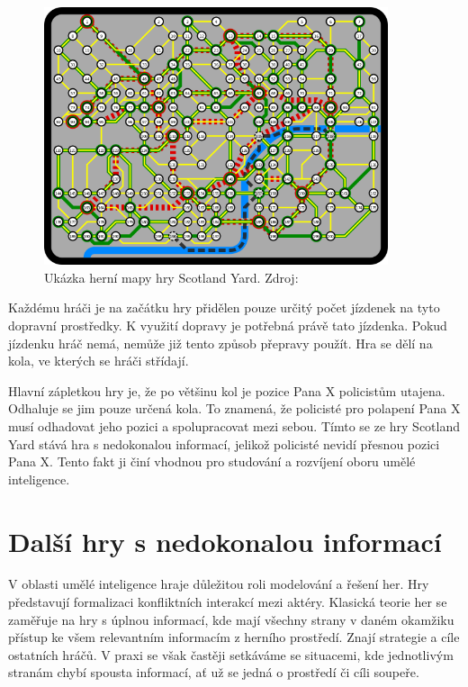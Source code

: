 \begin{figure}[H]
	\centering
	\includegraphics[width=0.9\textwidth]{obrazky-figures/scotland_original}
	\caption{Ukázka herní mapy hry Scotland Yard.
  Zdroj: \cite{scotland_original_image}}\label{fig:figure}
\end{figure}

Každému hráči je na začátku hry přidělen pouze určitý počet jízdenek na tyto dopravní prostředky.
K využití dopravy je potřebná právě tato jízdenka.
Pokud jízdenku hráč nemá, nemůže již tento způsob přepravy použít.
Hra se dělí na kola, ve kterých se hráči střídají.

Hlavní zápletkou hry je, že po většinu kol je pozice Pana X policistům utajena.
Odhaluje se jim pouze určená kola.
To znamená, že policisté pro polapení Pana X musí odhadovat jeho pozici a spolupracovat mezi sebou.
Tímto se ze hry Scotland Yard stává hra s nedokonalou informací, jelikož policisté nevidí přesnou pozici Pana X\@.
Tento fakt ji činí vhodnou pro studování a rozvíjení oboru umělé inteligence.

\section{Další hry s nedokonalou informací}\label{sec:dalsi-hry-s-nedokonalou-informaci}
V oblasti umělé inteligence hraje důležitou roli modelování a řešení her.
Hry představují formalizaci konfliktních interakcí mezi aktéry.
Klasická teorie her se zaměřuje na hry s úplnou informací, kde mají všechny strany v daném okamžiku přístup ke všem relevantním informacím z herního prostředí.
Znají strategie a cíle ostatních hráčů.
V praxi se však častěji setkáváme se situacemi, kde jednotlivým stranám chybí spousta informací, ať už se jedná o prostředí či cíli soupeře.

